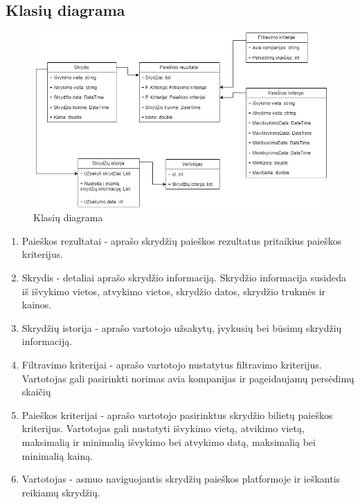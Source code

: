 \documentclass{VUMIFPSkursinis}
\begin{document}
            \subsection{Klasių diagrama}
                \begin{figure}[H]
                    \centering
                    \includegraphics[scale=0.6]{img/class_diagram}
                    \caption{Klasių diagrama}
                    \label{klasių diagrama}
                \end{figure}
                \begin{enumerate}[label=\textbf{E\arabic*}.]
                    \item Paieškos rezultatai - aprašo skrydžių paieškos rezultatus pritaikius paieškos kriterijus.
                    \item Skrydis - detaliai aprašo skrydžio informaciją. Skrydžio informacija susideda iš išvykimo vietos, atvykimo vietos, skrydžio datos, skrydžio trukmės ir kainos.
                    \item Skrydžių istorija - aprašo vartotojo užsakytų, įvykusių bei būsimų skrydžių informaciją.
                    \item Filtravimo kriterijai - aprašo vartotojo nustatytus filtravimo kriterijus. Vartotojas gali pasirinkti norimas avia kompanijas ir pageidaujamų persėdimų skaičių
                    \item Paieškos kriterijai - aprašo vartotojo pasirinktus skrydžio bilietų paieškos kriterijus. Vartotojas gali nustatyti išvykimo vietą, atvikimo vietą, maksimalią ir minimalią išvykimo bei atvykimo datą, maksimalią bei minimalią kainą.
                    \item Vartotojas - asmuo naviguojantis skrydžių paieškos platformoje ir ieškantis reikiamų skrydžių.
                \end{enumerate}
    
\end{document}
